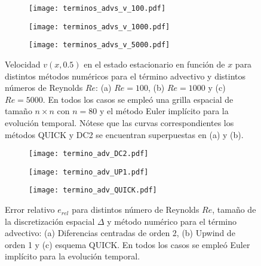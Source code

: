 \documentclass[aps,prb,twocolumn,superscriptaddress,floatfix,longbibliography,10pt]{revtex4-2}
\newcounter{para}
\begin{document}
\begin{figure}
  \centering
  \begin{subfigure}[b]{0.32\textwidth}
    \centering
    \texttt{[image: terminos\_advs\_v\_100.pdf]}
    \caption{}
    \label{fig:terminos_advs_v_100}
  \end{subfigure}
  \hfill
  \begin{subfigure}[b]{0.32\textwidth}
    \centering
    \texttt{[image: terminos\_advs\_v\_1000.pdf]}
    \caption{}
    \label{fig:terminos_advs_v_1000}
  \end{subfigure}
  \hfill
  \begin{subfigure}[b]{0.32\textwidth}
    \centering
    \texttt{[image: terminos\_advs\_v\_5000.pdf]}
    \caption{}
    \label{fig:terminos_advs_v_5000}
  \end{subfigure}
     \caption{Velocidad $v(x,0.5)$ en el estado estacionario en función de $x$ para distintos métodos numéricos para el término advectivo y distintos números de Reynolds $Re$: (a) $Re = 100$, (b) $Re = 1000$ y (c) $Re = 5000$. En todos los casos se empleó una grilla espacial de tamaño $n \times n$ con $n = 80$ y el método Euler implícito para la evolución temporal. Nótese que las curvas correspondientes los métodos QUICK y DC2 se encuentran superpuestas en (a) y (b).}
     \label{fig:terminos_advs_v}
\end{figure}



\begin{figure}
  \centering
  \begin{subfigure}[b]{0.32\textwidth}
      \centering
      \texttt{[image: termino\_adv\_DC2.pdf]}
      \caption{}
      \label{fig:termino_adv_DC2}
  \end{subfigure}
  \hfill
  \begin{subfigure}[b]{0.32\textwidth}
      \centering
      \texttt{[image: termino\_adv\_UP1.pdf]}
      \caption{}
      \label{fig:termino_adv_UP1}
  \end{subfigure}
  \hfill
  \begin{subfigure}[b]{0.32\textwidth}
      \centering
      \texttt{[image: termino\_adv\_QUICK.pdf]}
      \caption{}
      \label{fig:termino_adv_QUICK}
  \end{subfigure}
     \caption{Error relativo $e_{rel}$ para distintos número de Reynolds $Re$, tamaño de la discretización espacial $\Delta$ y método numérico para el término advectivo: (a) Diferencias centradas de orden 2, (b) Upwind de orden 1 y (c) esquema QUICK. En todos los casos se empleó Euler implícito para la evolución temporal.}
     \label{fig:termino_advectivo}
\end{figure}
\end{document}
